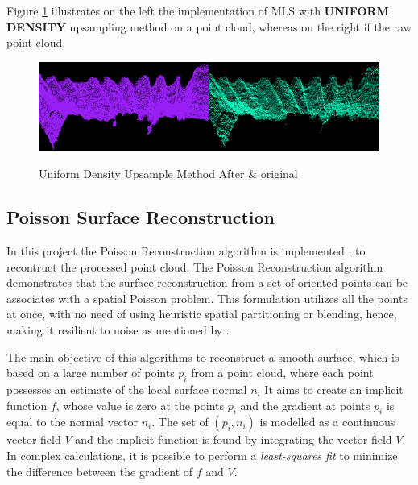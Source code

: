 \documentclass[12pt]{report}
\begin{document}
Figure \ref{fig:sUpsample_def} illustrates on the left the implementation of MLS with \textbf{UNIFORM DENSITY} upsampling method on a point cloud, whereas on the right if the raw point cloud.

\begin{figure}[H]%
  \centering
  \includegraphics[width=1\textwidth]{upsample_def.png}
 \caption{Uniform Density Upsample Method After \& original}\cite[]{ichim_2012}
 \label{fig:sUpsample_def} 
\end{figure}








\subsection{Poisson Surface Reconstruction}
\label{section:Poisson Surface Reconstruction}
In this project the Poisson Reconstruction algorithm is implemented , to recontruct the processed point cloud.
The Poisson Reconstruction algorithm demonstrates that the surface reconstruction from a set of oriented points can be associates with a spatial Poisson problem.
This formulation utilizes all the points at once, with no need of using heuristic spatial partitioning or blending, hence, making it resilient to noise as mentioned by .

The main objective of this algorithms to reconstruct a smooth surface, which is based on a large number of points $p_i$ from a point cloud, where each point possesses an estimate of the local surface normal $n_i$
It aims to create an implicit function $f$, whose value is zero at the points $p_i$ and the gradient at points $p_i$ is equal to the normal vector $n_i$.
The set of $(p_i,n_i)$ is modelled as a continuous vector field $V$ and the implicit function is found by integrating the vector field $V$.
In complex calculations, it is possible to perform a \textit{least-squares fit} to minimize the difference between the gradient of $f$ and $V$.
\end{document}
